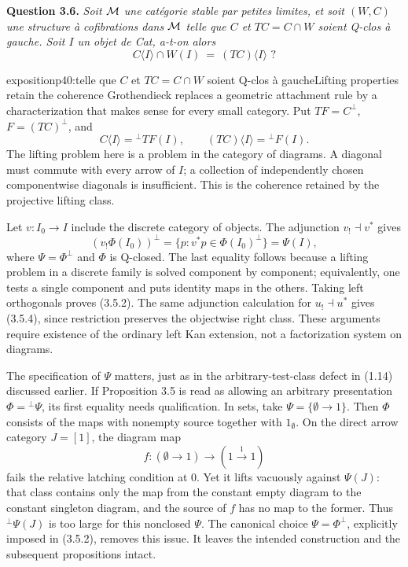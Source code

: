 \textbf{Question 3.6.} \textit{Soit $\mathcal{M}$ une catégorie stable par petites limites, et soit $(W,C)$ une structure à cofibrations dans $\mathcal{M}$ telle que $C$ et $TC=C\cap W$ soient Q-clos à gauche. Soit $I$ un objet de \textup{Cat}, a-t-on alors}
\[
C\langle I\rangle\cap W(I) \ = \ (TC)\langle I\rangle \text{ ?} \tag*{(3.6.1)}
\]

\begin{dcomment}{exposition}{p40:telle que $C$ et $TC=C\cap W$ soient Q-clos à gauche}{Lifting properties retain the coherence}
Grothendieck replaces a geometric attachment rule by a characterization that makes sense for every small category. Put $TF=C^\perp$, $F=(TC)^\perp$, and
\[
 C\langle I\rangle={}^\perp TF(I),\qquad
 (TC)\langle I\rangle={}^\perp F(I).
\]
The lifting problem here is a problem in the category of diagrams. A diagonal must commute with every arrow of $I$; a collection of independently chosen componentwise diagonals is insufficient. This is the coherence retained by the projective lifting class.

Let $v:I_0\to I$ include the discrete category of objects. The adjunction $v_!\dashv v^*$ gives
\[
 (v_!\Phi(I_0))^\perp
   =\{p:v^*p\in\Phi(I_0)^\perp\}
   =\Psi(I),
\]
where $\Psi=\Phi^\perp$ and $\Phi$ is Q-closed. The last equality follows because a lifting problem in a discrete family is solved component by component; equivalently, one tests a single component and puts identity maps in the others. Taking left orthogonals proves (3.5.2). The same adjunction calculation for $u_!\dashv u^*$ gives (3.5.4), since restriction preserves the objectwise right class. These arguments require existence of the ordinary left Kan extension, not a factorization system on diagrams.

The specification of $\Psi$ matters, just as in the arbitrary-test-class defect in (1.14) discussed earlier. If Proposition 3.5 is read as allowing an arbitrary presentation $\Phi={}^\perp\Psi$, its first equality needs qualification. In sets, take $\Psi=\{\emptyset\to1\}$. Then $\Phi$ consists of the maps with nonempty source together with $1_{\emptyset}$. On the direct arrow category $J=[1]$, the diagram map
\[
 f:(\emptyset\longrightarrow1)\longrightarrow(1\xrightarrow{1}1)
\]
fails the relative latching condition at $0$. Yet it lifts vacuously against $\Psi(J)$: that class contains only the map from the constant empty diagram to the constant singleton diagram, and the source of $f$ has no map to the former. Thus ${}^\perp\Psi(J)$ is too large for this nonclosed $\Psi$. The canonical choice $\Psi=\Phi^\perp$, explicitly imposed in (3.5.2), removes this issue. It leaves the intended construction and the subsequent propositions intact.


\end{dcomment}
